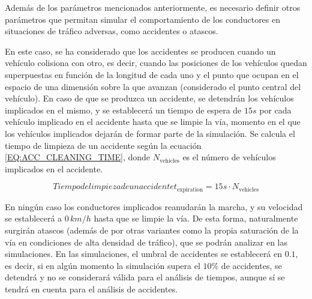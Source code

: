 
Además de los parámetros mencionados anteriormente, es necesario definir otros parámetros que permitan simular el comportamiento de los conductores en situaciones
de tráfico adversas, como accidentes o atascos.

En este caso, se ha considerado que los accidentes se producen cuando un vehículo colisiona con otro, es decir, cuando las posiciones de los vehículos quedan superpuestas
en función de la longitud de cada uno y el punto que ocupan en el espacio de una dimensión sobre la que avanzan (considerado el punto central del vehículo). En caso de que
se produzca un accidente, se detendrán los vehículos implicados en el mismo, y se establecerá un tiempo de espera de $15s$ por cada vehículo implicado en el accidente hasta
que se limpie la vía, momento en el que los vehículos implicados dejarán de formar parte de la simulación. Se calcula el tiempo de limpieza de un accidente según
la ecuación \ref{EQ:ACC_CLEANING_TIME}, donde $N_{\text{vehicles}}$ es el número de vehículos implicados en el accidente.

\begin{equation}[EQ:ACC_CLEANING_TIME]{Tiempo de limpieza de un accidente}
    t_{\text{expiration}} = 15s \cdot N_{\text{vehicles}}
\end{equation}

En ningún caso los conductores implicados reanudarán la marcha, y su velocidad se establecerá a $0 \, km/h$ hasta que se limpie la vía. De esta forma, naturalmente
surgirán atascos (además de por otras variantes como la propia saturación de la vía en condiciones de alta densidad de tráfico), que se podrán analizar en las
simulaciones. En las simulaciones, el umbral de accidentes se establecerá en $0.1$, es decir, si en algún momento la simulación supera el $10\%$ de accidentes, se
detendrá y no se considerará válida para el análisis de tiempos, aunque sí se tendrá en cuenta para el análisis de accidentes.

